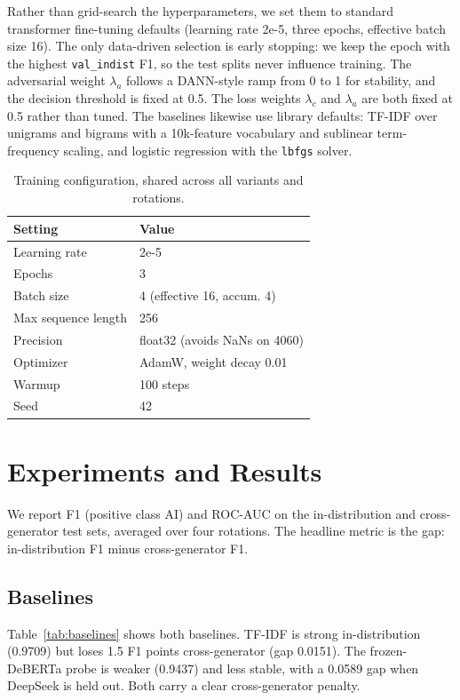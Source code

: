\documentclass[manuscript,nonacm]{acmart}
\begin{document}
Rather than grid-search the hyperparameters, we set them to standard transformer
fine-tuning defaults (learning rate 2e-5, three epochs, effective batch size 16).
The only data-driven selection is early stopping: we keep the epoch with the
highest \texttt{val\_indist} F1, so the test splits never influence training. The
adversarial weight $\lambda_a$ follows a DANN-style ramp from 0 to 1 for
stability, and the decision threshold is fixed at 0.5. The loss weights
$\lambda_c$ and $\lambda_a$ are both fixed at 0.5 rather than tuned. The
baselines likewise use library defaults: TF-IDF over unigrams and bigrams with a
10k-feature vocabulary and sublinear term-frequency scaling, and logistic
regression with the \texttt{lbfgs} solver.

\begin{table}[H]
\centering
\caption{Training configuration, shared across all variants and rotations.}
\label{tab:hparams}
\begin{tabular}{ll}
\toprule
Setting & Value \\
\midrule
Learning rate       & 2e-5 \\
Epochs              & 3 \\
Batch size          & 4 (effective 16, accum. 4) \\
Max sequence length & 256 \\
Precision           & float32 (avoids NaNs on 4060) \\
Optimizer           & AdamW, weight decay 0.01 \\
Warmup              & 100 steps \\
Seed                & 42 \\
\bottomrule
\end{tabular}
\end{table}

\section{Experiments and Results}

We report F1 (positive class AI) and ROC-AUC on the in-distribution and
cross-generator test sets, averaged over four rotations. The headline metric is
the gap: in-distribution F1 minus cross-generator F1.

\subsection{Baselines}
Table~\ref{tab:baselines} shows both baselines. TF-IDF is strong
in-distribution (0.9709) but loses 1.5 F1 points cross-generator (gap 0.0151).
The frozen-DeBERTa probe is weaker (0.9437) and less stable, with a 0.0589 gap
when DeepSeek is held out. Both carry a clear cross-generator penalty.
\end{document}
